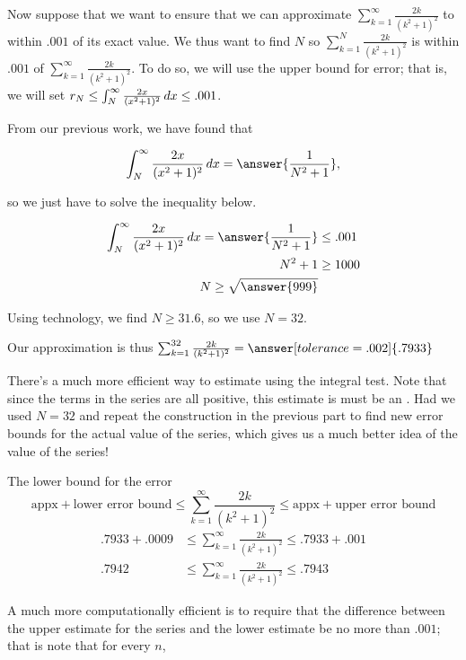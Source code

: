 \documentclass{ximera}
\begin{document}
\begin{exercise}
\begin{exercise}
\begin{exercise}
\begin{exercise}
Now suppose that we want to ensure that we can approximate $\sum_{k=1}^{\infty} \frac{2k}{(k^2+1)^2}$ to within $.001$ of its exact value.  We thus want to find $N$ so $\sum_{k=1}^{N} \frac{2k}{(k^2+1)^2}$ is within $.001$ of $\sum_{k=1}^{\infty} \frac{2k}{(k^2+1)^2}$.  To do so, we will use the upper bound for error; that is, we will set $r_N \leq \int_N^\infty \frac{2x}{(x^2+1)^2} \mathop{}\!d x \leq .001$.

From our previous work, we have found that

\[
 \int_N^\infty \frac{2x}{(x^2+1)^2} \d x= \answer{\frac{1}{N^2+1}},
\]

so we just have to solve the inequality below.

\begin{align*}
 \int_N^\infty \frac{2x}{(x^2+1)^2} \d x =  \answer{\frac{1}{N^2+1}} &\leq .001 \\
N^2+1 &\geq 1000 \\
N \geq \sqrt{\answer{999}}
\end{align*}

Using technology, we find $N \geq 31.6$, so we use $N=32$.

Our approximation is thus $\sum_{k=1}^{32} \frac{2k}{(k^2+1)^2} = \answer[tolerance=.002]{.7933}$

\begin{exercise}
There's a much more efficient way to estimate using the integral test.  Note that since the terms in the series are all positive, this estimate is must be an .  Had we used $N=32$ and repeat the construction in the previous part to find new error bounds for the actual value of the series, which gives us a much better idea of the value of the series!

The lower bound for the error
\[
\textrm{appx} + \textrm{lower error bound}  \leq \sum_{k=1}^{\infty} \frac{2k}{(k^2+1)^2}  \leq \textrm{appx} + \textrm{upper error bound} 
\]
\begin{align*}
.7933 +.0009 &\leq \sum_{k=1}^{\infty} \frac{2k}{(k^2+1)^2} \leq .7933 +.001 \\
.7942 &\leq  \sum_{k=1}^{\infty} \frac{2k}{(k^2+1)^2} \leq .7943 
\end{align*}

A much more computationally efficient is to require that the difference between the upper estimate for the series and the lower estimate be no more than $.001$; that is note that for every $n$,


\end{exercise}
\end{exercise}
\end{exercise}
\end{exercise}
\end{exercise}
\end{document}
